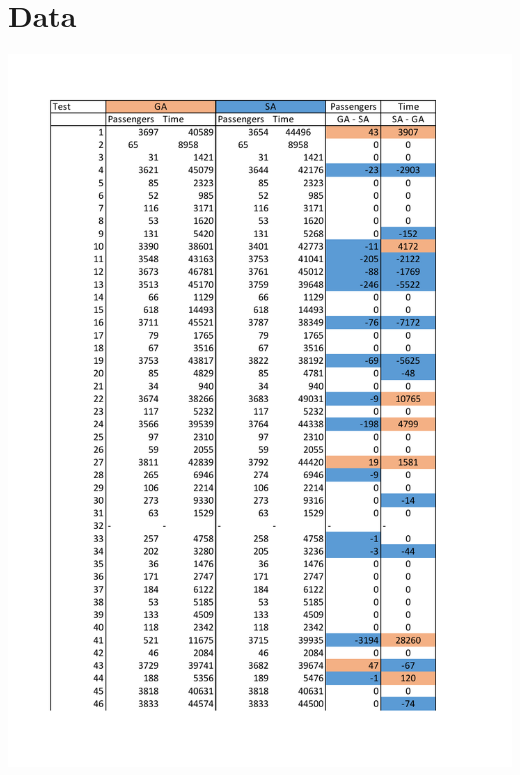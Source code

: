 \documentclass[10pt]{scrreprt}
\begin{document}
\chapter*{Data}
\begin{center}
    \includegraphics[scale = 0.8]{pictures/results1.pdf}

\end{center}
\end{document}
